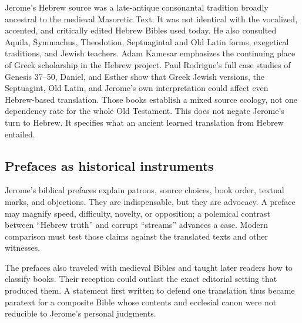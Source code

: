 Jerome's Hebrew source was a late-antique consonantal tradition broadly ancestral to the medieval Masoretic Text. It was not identical with the vocalized, accented, and critically edited Hebrew Bibles used today. He also consulted Aquila, Symmachus, Theodotion, Septuagintal and Old Latin forms, exegetical traditions, and Jewish teachers. Adam Kamesar emphasizes the continuing place of Greek scholarship in the Hebrew project. Paul Rodrigue's full case studies of Genesis 37--50, Daniel, and Esther show that Greek Jewish versions, the Septuagint, Old Latin, and Jerome's own interpretation could affect even Hebrew-based translation. Those books establish a mixed source ecology, not one dependency rate for the whole Old Testament. This does not negate Jerome's turn to Hebrew. It specifies what an ancient learned translation from Hebrew entailed.

\subsection{Prefaces as historical instruments}

Jerome's biblical prefaces explain patrons, source choices, book order, textual marks, and objections. They are indispensable, but they are advocacy. A preface may magnify speed, difficulty, novelty, or opposition; a polemical contrast between ``Hebrew truth'' and corrupt ``streams'' advances a case. Modern comparison must test those claims against the translated texts and other witnesses.

The prefaces also traveled with medieval Bibles and taught later readers how to classify books. Their reception could outlast the exact editorial setting that produced them. A statement first written to defend one translation thus became paratext for a composite Bible whose contents and ecclesial canon were not reducible to Jerome's personal judgments.

